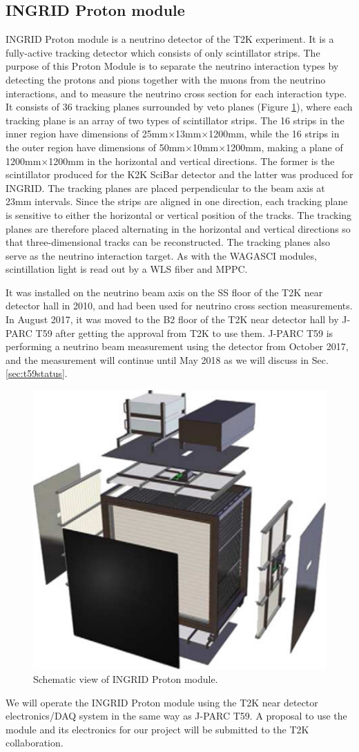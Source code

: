 \subsection{INGRID Proton module}
INGRID Proton module is a neutrino detector of the T2K experiment.
It is a fully-active tracking detector which consists of only scintillator strips. 
The purpose of this Proton Module is to separate the neutrino interaction types by detecting the protons and pions together with the muons from the neutrino interactions, and to measure the neutrino cross section for each interaction type.
It consists of 36 tracking planes surrounded by veto planes (Figure \ref{fig:proton_module}), where each tracking plane is an array of two types of scintillator strips. 
The 16 strips in the inner region have dimensions of 25mm$\times$13mm$\times$1200mm, while the 16 strips in the outer region have dimensions of 50mm$\times$10mm$\times$1200mm, making a plane of 1200mm$\times$1200mm in the horizontal and vertical directions.
The former is the scintillator produced for the K2K SciBar detector \cite{scibar} and the latter was produced for INGRID.
The tracking planes are placed perpendicular to the beam axis at 23mm intervals.
Since the strips are aligned in one direction, each tracking plane is sensitive to either the horizontal or vertical position of the tracks.
The tracking planes are therefore placed alternating in the horizontal and vertical directions so that three-dimensional tracks can be reconstructed.
The tracking planes also serve as the neutrino interaction target.
As with the WAGASCI modules, scintillation light is read out by a WLS fiber and MPPC.


It was installed on the neutrino beam axis on the SS floor of the T2K near detector hall in 2010, and had been used for neutrino cross section measurements.
In August 2017, it was moved to the B2 floor of the T2K near detector hall by J-PARC T59 after getting the approval from T2K to use them.
J-PARC T59 is performing a  neutrino beam measurement using the detector from October 2017, and the measurement  will continue until May 2018 as we will discuss in Sec. \ref{sec:t59status}.

\begin{figure}[tbh]
\begin{center}
\includegraphics[width=0.5\linewidth]{fig/proton_module.pdf}
\end{center}
\caption{
Schematic view of INGRID Proton module.
}
\label{fig:proton_module}
\end{figure}


We will operate the INGRID Proton module using the T2K near detector electronics/DAQ system in the same way as J-PARC T59.
A proposal to use the module and its electronics for our project will be submitted to the T2K collaboration.

